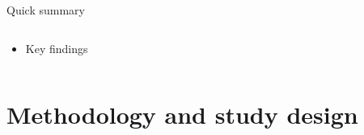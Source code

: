 \begin{frame}{Quick summary}
  
  \begin{columns}[T]
  \begin{column}{9cm}
  \centering

    \begin{itemize}
    \item Key findings
    \end{itemize}
  \end{column}
  \end{columns}
  
\end{frame}


\section{Methodology and study design}


